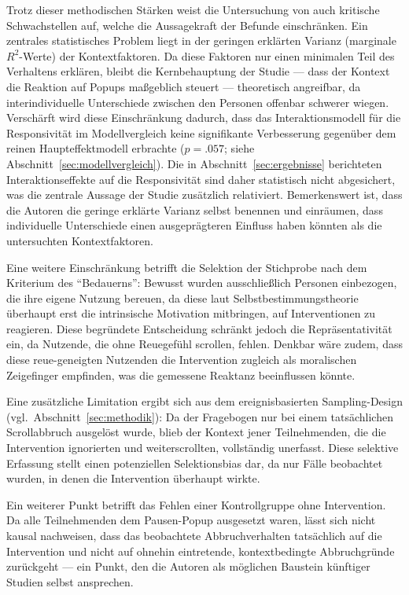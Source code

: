 \documentclass[11pt,a4paper]{article}
\begin{document}
Trotz dieser methodischen Stärken weist die Untersuchung von \citet{meinhardt2025scrolling}
auch kritische Schwachstellen auf, welche die Aussagekraft der Befunde einschränken. Ein
zentrales statistisches Problem liegt in der geringen erklärten Varianz (marginale
$R^2$-Werte) der Kontextfaktoren. Da diese Faktoren nur einen minimalen Teil des Verhaltens
erklären, bleibt die Kernbehauptung der Studie --- dass der Kontext die Reaktion auf Popups
maßgeblich steuert --- theoretisch angreifbar, da interindividuelle Unterschiede zwischen
den Personen offenbar schwerer wiegen. Verschärft wird diese Einschränkung dadurch, dass das
Interaktionsmodell für die Responsivität im Modellvergleich keine signifikante Verbesserung
gegenüber dem reinen Haupteffektmodell erbrachte ($p=.057$; siehe
Abschnitt~\ref{sec:modellvergleich}). Die in Abschnitt~\ref{sec:ergebnisse} berichteten
Interaktionseffekte auf die Responsivität sind daher statistisch nicht abgesichert, was die
zentrale Aussage der Studie zusätzlich relativiert.
Bemerkenswert ist, dass die Autoren die geringe erklärte Varianz
selbst benennen und einräumen, dass individuelle Unterschiede einen
ausgeprägteren Einfluss haben könnten als die untersuchten Kontextfaktoren.

Eine weitere
Einschränkung betrifft die Selektion der Stichprobe nach dem Kriterium des
\enquote{Bedauerns}: Bewusst wurden ausschließlich Personen einbezogen, die ihre eigene
Nutzung bereuen, da diese laut Selbstbestimmungstheorie überhaupt erst die intrinsische
Motivation mitbringen, auf Interventionen zu reagieren. Diese begründete Entscheidung
schränkt jedoch die Repräsentativität ein, da Nutzende, die ohne Reuegefühl scrollen,
fehlen. Denkbar wäre zudem, dass diese reue-geneigten Nutzenden die Intervention zugleich
als moralischen Zeigefinger empfinden, was die gemessene Reaktanz beeinflussen könnte.

Eine zusätzliche Limitation ergibt sich aus dem ereignisbasierten Sampling-Design (vgl.\
Abschnitt~\ref{sec:methodik}): Da der Fragebogen nur bei einem tatsächlichen Scrollabbruch
ausgelöst wurde, blieb der Kontext jener Teilnehmenden, die die Intervention ignorierten und
weiterscrollten, vollständig unerfasst. Diese selektive Erfassung stellt einen potenziellen
Selektionsbias dar, da nur Fälle beobachtet wurden, in denen die Intervention überhaupt
wirkte.

Ein weiterer Punkt betrifft das Fehlen einer Kontrollgruppe ohne Intervention. Da alle
Teilnehmenden dem Pausen-Popup ausgesetzt waren, lässt sich nicht kausal nachweisen, dass
das beobachtete Abbruchverhalten tatsächlich auf die Intervention und nicht auf ohnehin
eintretende, kontextbedingte Abbruchgründe zurückgeht --- ein Punkt, den die Autoren als
möglichen Baustein künftiger Studien selbst ansprechen.
\end{document}
